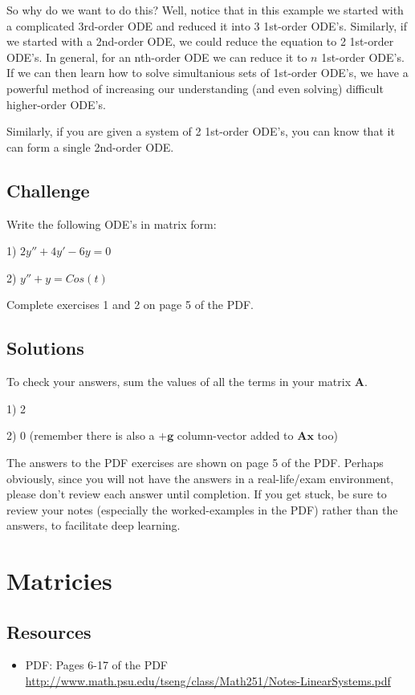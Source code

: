 So why do we want to do this? Well, notice that in this example we started with a complicated 3rd-order ODE and reduced it into 3 1st-order ODE's. Similarly, if we started with a 2nd-order ODE, we could reduce the equation to 2 1st-order ODE's. In general, for an nth-order ODE we can reduce it to $n$ 1st-order ODE's. If we can then learn how to solve simultanious sets of 1st-order ODE's, we have a powerful method of increasing our understanding (and even solving) difficult higher-order ODE's. 

Similarly, if you are given a system of 2 1st-order ODE's, you can know that it can form a single 2nd-order ODE. 

\subsection*{Challenge}
Write the following ODE's in matrix form:

1) $2 y'' + 4 y' - 6 y = 0$

2) $y'' + y = Cos(t)$

Complete exercises 1 and 2 on page 5 of the PDF.

\subsection*{Solutions}
To check your answers, sum the values of all the terms in your matrix $\bm{A}$.

1) 2

2) 0 (remember there is also a $+\bm{g}$ column-vector added to $\bm{A}\bm{x}$ too)

The answers to the PDF exercises are shown on page 5 of the PDF. Perhaps obviously, since you will not have the answers in a real-life/exam environment, please don't review each answer until completion. If you get stuck, be sure to review your notes (especially the worked-examples in the PDF) rather than the answers, to facilitate deep learning. 




\newpage
%
\section{Matricies}

\subsection*{Resources}
\begin{itemize}
    \item PDF: Pages 6-17 of the PDF \url{http://www.math.psu.edu/tseng/class/Math251/Notes-LinearSystems.pdf}
\end{itemize}

